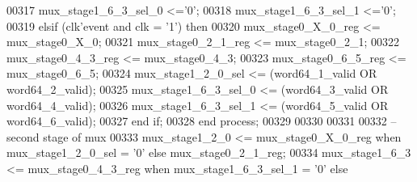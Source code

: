\begin{DoxyCode}
00317       \textcolor{vhdlchar}{mux_stage1_6_3_sel_0} \textcolor{vhdlchar}{<=}\textcolor{vhdlchar}{'}\textcolor{vhdllogic}{}\textcolor{vhdllogic}{0}\textcolor{vhdlchar}{'};
00318       \textcolor{vhdlchar}{mux_stage1_6_3_sel_1} \textcolor{vhdlchar}{<=}\textcolor{vhdlchar}{'}\textcolor{vhdllogic}{}\textcolor{vhdllogic}{0}\textcolor{vhdlchar}{'};
00319    \textcolor{keywordflow}{elsif} \textcolor{vhdlchar}{(}\textcolor{vhdlchar}{clk}\textcolor{vhdlchar}{'}\textcolor{vhdlkeyword}{event} \textcolor{keywordflow}{and} \textcolor{vhdlchar}{clk} \textcolor{vhdlchar}{=} \textcolor{vhdlchar}{'}\textcolor{vhdllogic}{}\textcolor{vhdllogic}{1}\textcolor{vhdlchar}{'}\textcolor{vhdlchar}{)} \textcolor{keywordflow}{then}
00320       \textcolor{vhdlchar}{mux_stage0_X_0_reg}   \textcolor{vhdlchar}{<=} \textcolor{vhdlchar}{mux_stage0_X_0};
00321       \textcolor{vhdlchar}{mux_stage0_2_1_reg}   \textcolor{vhdlchar}{<=} \textcolor{vhdlchar}{mux_stage0_2_1};
00322       \textcolor{vhdlchar}{mux_stage0_4_3_reg}   \textcolor{vhdlchar}{<=} \textcolor{vhdlchar}{mux_stage0_4_3};
00323       \textcolor{vhdlchar}{mux_stage0_6_5_reg}   \textcolor{vhdlchar}{<=} \textcolor{vhdlchar}{mux_stage0_6_5};
00324       \textcolor{vhdlchar}{mux_stage1_2_0_sel}   \textcolor{vhdlchar}{<=} \textcolor{vhdlchar}{(}\textcolor{vhdlchar}{word64_1_valid} \textcolor{keywordflow}{OR} \textcolor{vhdlchar}{word64_2_valid}\textcolor{vhdlchar}{)};
00325       \textcolor{vhdlchar}{mux_stage1_6_3_sel_0} \textcolor{vhdlchar}{<=} \textcolor{vhdlchar}{(}\textcolor{vhdlchar}{word64_3_valid} \textcolor{keywordflow}{OR} \textcolor{vhdlchar}{word64_4_valid}\textcolor{vhdlchar}{)};  
00326       \textcolor{vhdlchar}{mux_stage1_6_3_sel_1} \textcolor{vhdlchar}{<=} \textcolor{vhdlchar}{(}\textcolor{vhdlchar}{word64_5_valid} \textcolor{keywordflow}{OR} \textcolor{vhdlchar}{word64_6_valid}\textcolor{vhdlchar}{)};     
00327    \textcolor{keywordflow}{end} \textcolor{keywordflow}{if};
00328 \textcolor{keywordflow}{end} \textcolor{keywordflow}{process};
00329 
00330 
00331 
00332 \textcolor{keyword}{--second stage of mux}
00333 \textcolor{vhdlchar}{mux_stage1_2_0} \textcolor{vhdlchar}{<=} \textcolor{vhdlchar}{mux_stage0_X_0_reg} \textcolor{keywordflow}{when} \textcolor{vhdlchar}{mux_stage1_2_0_sel} \textcolor{vhdlchar}{=} \textcolor{vhdlchar}{'}\textcolor{vhdllogic}{}\textcolor{vhdllogic}{0}\textcolor{vhdlchar}{'}   \textcolor{keywordflow}{else} \textcolor{vhdlchar}{
      mux_stage0_2_1_reg};
00334 \textcolor{vhdlchar}{mux_stage1_6_3} \textcolor{vhdlchar}{<=} \textcolor{vhdlchar}{mux_stage0_4_3_reg} \textcolor{keywordflow}{when} \textcolor{vhdlchar}{mux_stage1_6_3_sel_1} \textcolor{vhdlchar}{=} \textcolor{vhdlchar}{'}\textcolor{vhdllogic}{}\textcolor{vhdllogic}{0}\textcolor{vhdlchar}{'} \textcolor{keywordflow}{else} \textcolor{vhdlchar}{
}
\end{DoxyCode}
